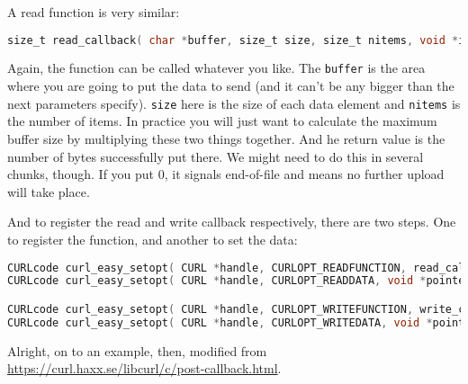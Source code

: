 A read function is very similar:
\begin{lstlisting}[language=C]
size_t read_callback( char *buffer, size_t size, size_t nitems, void *inputdata );
\end{lstlisting}
Again, the function can be called whatever you like. The \texttt{buffer} is the area where you are going to put the data to send (and it can't be any bigger than the next parameters specify). \texttt{size} here is the size of each data element and \texttt{nitems} is the number of items. In practice you will just want to calculate the maximum buffer size by multiplying these two things together. And he return value is the number of bytes successfully put there. We might need to do this in several chunks, though. If you put 0, it signals end-of-file and means no further upload will take place.

And to register the read and write callback respectively, there are two steps. One to register the function, and another to set the data:
\begin{lstlisting}[language=C]
CURLcode curl_easy_setopt( CURL *handle, CURLOPT_READFUNCTION, read_callback );
CURLcode curl_easy_setopt( CURL *handle, CURLOPT_READDATA, void *pointer );

CURLcode curl_easy_setopt( CURL *handle, CURLOPT_WRITEFUNCTION, write_callback );
CURLcode curl_easy_setopt( CURL *handle, CURLOPT_WRITEDATA, void *pointer );
\end{lstlisting}

Alright, on to an example, then, modified from \url{https://curl.haxx.se/libcurl/c/post-callback.html}. 

